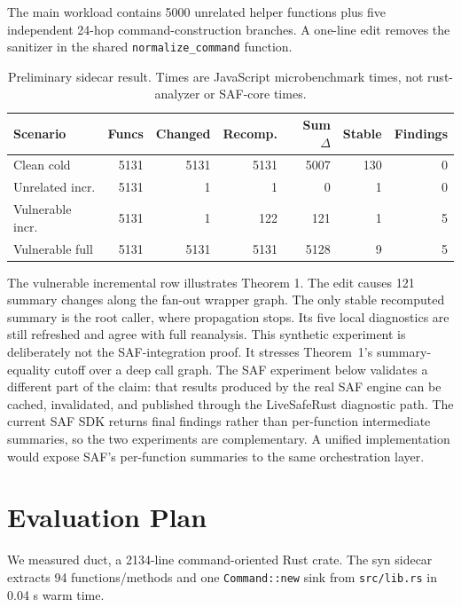 \documentclass[sigconf,nonacm]{acmart}
\begin{document}
The main workload contains 5000 unrelated helper functions plus five independent
24-hop command-construction branches. A one-line edit removes the sanitizer in
the shared \texttt{normalize\_command} function.

\begin{table}[h]
\caption{Preliminary sidecar result. Times are JavaScript microbenchmark times,
not rust-analyzer or SAF-core times.}
\label{tab:prelim}
\begin{tabular}{lrrrrrr}
\toprule
Scenario & Funcs & Changed & Recomp. & Sum $\Delta$ & Stable & Findings \\
\midrule
Clean cold & 5131 & 5131 & 5131 & 5007 & 130 & 0 \\
Unrelated incr. & 5131 & 1 & 1 & 0 & 1 & 0 \\
Vulnerable incr. & 5131 & 1 & 122 & 121 & 1 & 5 \\
Vulnerable full & 5131 & 5131 & 5131 & 5128 & 9 & 5 \\
\bottomrule
\end{tabular}
\end{table}

The vulnerable incremental row illustrates Theorem 1. The edit causes 121
summary changes along the fan-out wrapper graph. The only stable recomputed
summary is the root caller, where propagation stops. Its five local diagnostics
are still refreshed and agree with full reanalysis.
This synthetic experiment is deliberately not the SAF-integration proof. It
stresses Theorem~1's summary-equality cutoff over a deep call graph. The SAF
experiment below validates a different part of the claim: that results produced
by the real SAF engine can be cached, invalidated, and published through the
LiveSafeRust diagnostic path. The current SAF SDK returns final findings rather
than per-function intermediate summaries, so the two experiments are
complementary. A unified implementation would expose SAF's per-function
summaries to the same orchestration layer.

\section{Evaluation Plan}

We measured duct, a 2134-line command-oriented Rust crate. The syn sidecar
extracts 94 functions/methods and one \texttt{Command::new} sink from
\texttt{src/lib.rs} in 0.04 s warm time.
\end{document}
